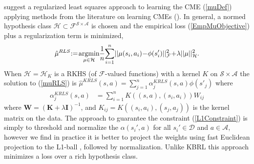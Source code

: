 \documentclass[letterpaper]{article}
\newcommand{\GrunewalderEmbeddingsRL}{GrunewalderEmbeddingsMDP}
\newcommand{\GrunewalderEmbeddingsRegression}{GrunewalderEmbeddingsRegression}
\newcommand{\SongKernelEmbedding}{DBLP:journals/spm/SongFG13}
\newcommand{\OrmoneitKBRL}{DBLP:journals/ml/OrmoneitS02}
\newcommand{\DuchiProjections}{DBLP:conf/icml/DuchiSSC08}
\newcommand{\TibshiraniLasso}{tibshirani96regression}
\newcommand{\cD}{{\mathcal D}}
\newcommand{\cH}{{\mathcal H}}
\newcommand{\cF}{{\mathcal F}}
\newcommand{\cA}{{\mathcal A}}
\newcommand{\cS}{{\mathcal S}}
\newcommand{\balpha}{{\bm \alpha}}
\newcommand{\bbeta}{{\bm \beta}}
\newcommand{\bK}{{\bm K}}
\newcommand{\bW}{{\bm W}}
\newcommand{\bI}{{\bm I}}
\newcommand{\E}{{\mathbb E}}
\newcommand{\R}{{\mathbb R}}
\newcommand{\argmin}{\operatornamewithlimits{argmin}}
\newcommand{\nn}{\nonumber}
\begin{document}
\cite{\GrunewalderEmbeddingsRL} suggest a regularized least squares approach to learning the CME (\ref{muDef}) applying methods from the literature on learning CMEs (\cite{\SongKernelEmbedding,\GrunewalderEmbeddingsRegression}). In general, a normed hypothesis class $\cH\subset \cF^{\cS\times\cA}$ is chosen and the empirical loss (\ref{EmpMuObjective}) plus a regularization term is minimized,
\begin{align}
\hat\mu^{RLS}\hspace{-0.9mm} := \hspace{-0.6mm}\argmin_{\mu\in\cH}  \hspace{-0.7mm}\frac{1}{n}\hspace{-0.7mm}\sum_{i=1}^n\hspace{-0.6mm} || \mu (s_i,a_i) \hspace{-0.7mm}-\hspace{-0.7mm} \phi(s'_i) ||_\cF^2 \hspace{-0.7mm}+\hspace{-0.7mm}\lambda ||\mu||^2_{\cH} . \label{muRLS}
\end{align}
When $\cH=\cH_K$ is a RKHS (of $\cF$-valued functions) with a kernel $K$ on $\cS\times\cA$ the solution to (\ref{muRLS}) is $\hat\mu^{KRLS}(s,a) = \sum_{j=1}^n \alpha_j^{KRLS}(s,a) \phi(s'_j)$ where
\begin{align}
\alpha_j^{KRLS}(s,a) &=  \sum_{i=1}^n K((s,a),(s_i,a_i)) W_{ij}  \label{KRLSalphas}
\end{align}
where $\bW = (\bK + \lambda \bI)^{-1}$, and $K_{ij} = K((s_i,a_i),(s_j,a_j))$ is the kernel matrix on the data. The approach to guarantee the constraint (\ref{L1Constraint}) is simply to threshold and normalize the $\alpha(s_i',a)$ for all $s_i'\in\cD$ and $a\in\cA$, however we find in practice it is better to project the weights using fast Euclidean projection to the L1-ball \citep[e.g.][]{\DuchiProjections}, followed by normalization.%
Unlike KBRL \citep{\OrmoneitKBRL} this approach minimizes a loss over a rich hypothesis class.
\end{document}
